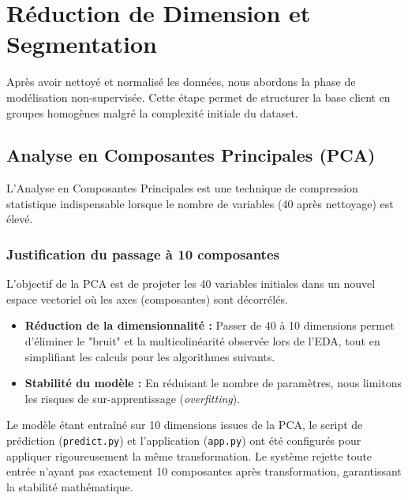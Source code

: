 \documentclass[11pt,a4paper]{article}
\begin{document}
\section{Réduction de Dimension et Segmentation}

Après avoir nettoyé et normalisé les données, nous abordons la phase de modélisation non-supervisée. Cette étape permet de structurer la base client en groupes homogènes malgré la complexité initiale du dataset.

\subsection{Analyse en Composantes Principales (PCA)}
L'Analyse en Composantes Principales est une technique de compression statistique indispensable lorsque le nombre de variables (40 après nettoyage) est élevé.

\subsubsection{Justification du passage à 10 composantes}
L'objectif de la PCA est de projeter les 40 variables initiales dans un nouvel espace vectoriel où les axes (composantes) sont décorrélés. 
\begin{itemize}
    \item \textbf{Réduction de la dimensionnalité :} Passer de 40 à 10 dimensions permet d'éliminer le "bruit" et la multicolinéarité observée lors de l'EDA, tout en simplifiant les calculs pour les algorithmes suivants.
    \item \textbf{Stabilité du modèle :} En réduisant le nombre de paramètres, nous limitons les risques de sur-apprentissage (\textit{overfitting}).
\end{itemize}


\begin{tcolorbox}[title=Rigueur Technique]
Le modèle étant entraîné sur 10 dimensions issues de la PCA, le script de prédiction (\texttt{predict.py}) et l'application (\texttt{app.py}) ont été configurés pour appliquer rigoureusement la même transformation. Le système rejette toute entrée n'ayant pas exactement 10 composantes après transformation, garantissant la stabilité mathématique.
\end{tcolorbox}
\end{document}
